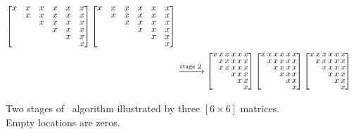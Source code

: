 \begin{figure}
\begin{align*}
    \begin{bmatrix}
      x & x & x & x & x & x \\
      & x & x & x & x & x \\
      &   & x & x & x & x \\
      &   &   & x & x & x \\
      &   &   &   & x & x \\
      &   &   &   &   & x \\
    \end{bmatrix}
    \begin{bmatrix}
      x & x & x & x & x & x \\
      & x & x & x & x & x \\
      &   & x & x & x & x \\
      &   &   & x & x & x \\
      &   &   &   & x & x \\
      &   &   &   &   & x \\
    \end{bmatrix} \\
        & \xrightarrow{\normalsize \text{stage 2}}
          \small
          \setlength\arraycolsep{1pt}
          \renewcommand{\arraystretch}{0.7}
          \begin{bmatrix}
            x & x & x & x & x & x \\
            & x & x & x & x & x \\
            & x & x & x & x & x \\
            &   &   & x & x & x \\
            &   &   &   & x & x \\
            &   &   &   &   & x \\
          \end{bmatrix}
    \begin{bmatrix}
      x & x & x & x & x & x \\
      & x & x & x & x & x \\
      &   & x & x & x & x \\
      &   &   & x & x & x \\
      &   &   &   & x & x \\
      &   &   &   &   & x \\
    \end{bmatrix}
    \begin{bmatrix}
      x & x & x & x & x & x \\
      & x & x & x & x & x \\
      &   & x & x & x & x \\
      &   &   & x & x & x \\
      &   &   &   & x & x \\
      &   &   &   &   & x \\
    \end{bmatrix}
  \end{align*}
  \caption[Two stages of \psd\ algorithm ]
  {Two stages of \psd\ algorithm illustrated by
    three $[6\!\times\! 6]$ matrices. Empty locations are zeros.}
  \label{fig:PSD}
\end{figure}
